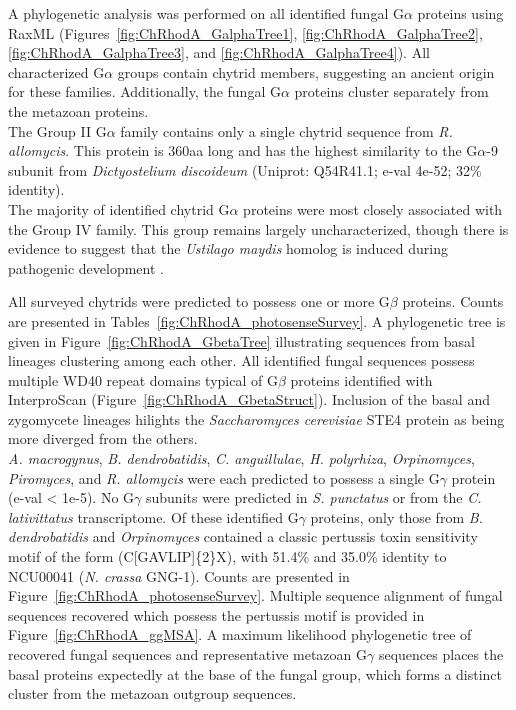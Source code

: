 \indent A phylogenetic analysis was performed on all identified fungal G$\alpha$ proteins using RaxML (Figures~\ref{fig:ChRhodA_GalphaTree1}, \ref{fig:ChRhodA_GalphaTree2}, \ref{fig:ChRhodA_GalphaTree3}, and \ref{fig:ChRhodA_GalphaTree4}). All characterized G$\alpha$ groups contain chytrid members, suggesting an ancient origin for these families. Additionally, the fungal G$\alpha$ proteins cluster separately from the metazoan proteins.\\
The Group II G$\alpha$ family contains only a single chytrid sequence from \textit{R. allomycis}. This protein is 360aa long and has the highest similarity to the G$\alpha$-9 subunit from \textit{Dictyostelium discoideum} (Uniprot: Q54R41.1; e-val 4e-52; 32\% identity).\\
The majority of identified chytrid G$\alpha$ proteins were most closely associated with the Group IV family. This group remains largely uncharacterized, though there is evidence to suggest that the \textit{Ustilago maydis} homolog is induced during pathogenic development \cite{Bolker1998}. 

\indent All surveyed chytrids were predicted to possess one or more G$\beta$ proteins. Counts are presented in Tables~\ref{fig:ChRhodA_photosenseSurvey}. A phylogenetic
tree is given in Figure~\ref{fig:ChRhodA_GbetaTree} illustrating sequences from basal lineages clustering among each other. All identified fungal sequences possess multiple WD40 repeat domains typical of G$\beta$ proteins identified with InterproScan (Figure~\ref{fig:ChRhodA_GbetaStruct}). Inclusion of the basal and zygomycete lineages hilights the \textit{Saccharomyces cerevisiae} STE4 protein as being more diverged from the others.\\

\indent \textit{A. macrogynus}, \textit{B. dendrobatidis}, \textit{C. anguillulae}, \textit{H. polyrhiza}, \textit{Orpinomyces}, \textit{Piromyces}, and \textit{R. allomycis} were each predicted to possess a single G$\gamma$ protein (e-val < 1e-5). No G$\gamma$ subunits were predicted in \textit{S. punctatus} or from the \textit{C. lativittatus} transcriptome. Of these identified G$\gamma$ proteins, only those from \textit{B. dendrobatidis} and \textit{Orpinomyces} contained a classic pertussis toxin sensitivity motif of the form (C[GAVLIP]\{2\}X), with 51.4\% and 35.0\% identity to NCU00041 (\textit{N. crassa} GNG-1). Counts are presented in Figure~\ref{fig:ChRhodA_photosenseSurvey}. Multiple sequence alignment of fungal sequences recovered which possess the pertussis motif is provided in Figure~\ref{fig:ChRhodA_ggMSA}. A maximum likelihood phylogenetic tree of recovered fungal sequences and representative metazoan G$\gamma$ sequences places the basal proteins expectedly at the base of the fungal group, which forms a distinct cluster from the metazoan outgroup sequences.\\

